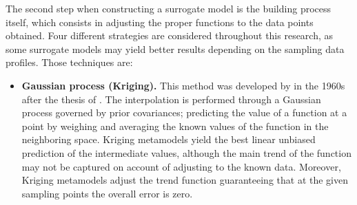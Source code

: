 \documentclass[12pt,number,preprint,review,times]{elsarticle}
\begin{document}
The second step when constructing a surrogate model is the building process itself, which consists in adjusting the proper functions to the data points obtained. Four different strategies are considered throughout this research, as some surrogate models may yield better results depending on the sampling data profiles. Those techniques are: %
\begin{itemize}
\item \textbf{Gaussian process (Kriging).} This method was developed by \citet{matheron1963principles} in the 1960s after the thesis of \citet{Krige1951}. The interpolation is performed through a Gaussian process governed by prior covariances; predicting the value of a function at a point by weighing and averaging the known values of the function in the neighboring space. Kriging metamodels yield the best linear unbiased prediction of the intermediate values, although the main trend of the function may not be captured on account of adjusting to the known data. Moreover, Kriging metamodels adjust the trend function guaranteeing that at the given sampling points the overall error is zero. %



\end{itemize}
\end{document}
